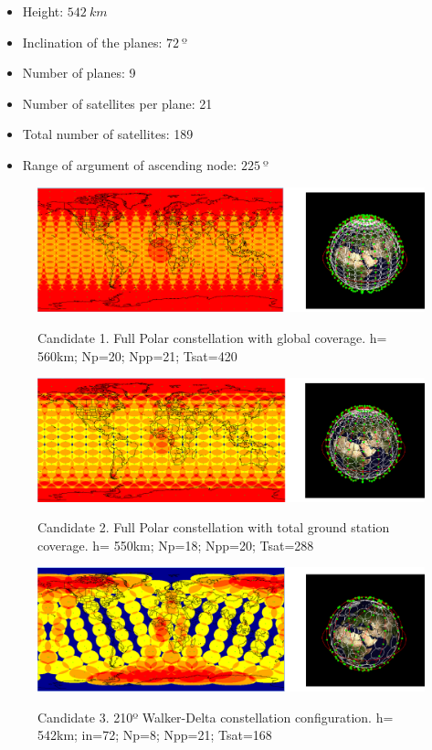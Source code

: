 \begin{itemize}
\item Height: $542~{km}$ 
\item Inclination of the planes: $72~{º}$  
\item Number of planes: 9
\item Number of satellites per plane: 21
\item Total number of satellites: 189
\item Range of argument of ascending node: $225~{º}$
\end{itemize}

\begin{figure}%
	\centering
	\includegraphics[width=1\textwidth]{Candidate1.png}\\
	\caption{Candidate 1. Full Polar constellation with global coverage.
			 h= 560km; Np=20; Npp=21; Tsat=420 }
	\label{fig:Candidate1}
\end{figure}

\begin{figure}%
	\centering
	\includegraphics[width=1\textwidth]{Candidate2.png}\\
	\caption{Candidate 2. Full Polar constellation with total ground station coverage.
			 h= 550km; Np=18; Npp=20; Tsat=288 }
	\label{fig:Candidate2}
\end{figure}

\begin{figure}%
	\centering
	\includegraphics[width=1\textwidth]{Candidate3.png}\\
	\caption{Candidate 3. 210º Walker-Delta constellation configuration.
			 h= 542km; in=72; Np=8; Npp=21; Tsat=168 }
	\label{fig:Candidate3}
\end{figure}

